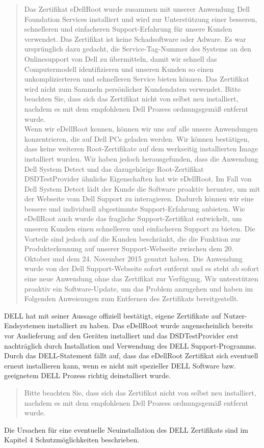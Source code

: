 \begin{quote}
	\glqq[...] Das Zertifikat eDellRoot wurde zusammen mit unserer Anwendung Dell Foundation Services installiert und wird zur Unterstützung einer besseren, schnelleren und einfacheren Support-Erfahrung für unsere Kunden verwendet. Das Zertifikat ist keine Schadsoftware oder Adware. Es war ursprünglich dazu gedacht, die Service-Tag-Nummer des Systems an den Onlinesupport von Dell zu übermitteln, damit wir schnell das Computermodell identifizieren und unseren Kunden so einen unkomplizierteren und schnelleren Service bieten können. Das Zertifikat wird nicht zum Sammeln persönlicher Kundendaten verwendet. Bitte beachten Sie, dass sich das Zertifikat nicht von selbst neu installiert, nachdem es mit dem empfohlenen Dell Prozess ordnungsgemäß entfernt wurde.\\
	Wenn wir eDellRoot kennen, können wir uns auf alle unsere Anwendungen konzentrieren, die auf Dell PCs geladen werden. Wir können bestätigen, dass keine weiteren Root-Zertifikate auf dem werkseitig installierten Image installiert wurden. Wir haben jedoch herausgefunden, dass die Anwendung Dell System Detect  und das dazugehörige Root-Zertifikat DSDTestProvider ähnliche Eigenschaften hat wie eDellRoot. Im Fall von Dell System Detect lädt der Kunde die Software proaktiv herunter, um mit der Webseite vom Dell Support zu interagieren. Dadurch können wir eine bessere und individuell abgestimmte Support-Erfahrung anbieten. Wie eDellRoot auch wurde das fragliche Support-Zertifikat entwickelt, um unseren Kunden einen schnelleren und einfacheren Support zu bieten. Die Vorteile sind jedoch auf die Kunden beschränkt, die die Funktion zur Produkterkennung auf unserer Support-Webseite zwischen dem 20. Oktober und dem 24. November 2015 genutzt haben. Die Anwendung wurde von der Dell Support-Webseite sofort entfernt und es steht ab sofort eine neue Anwendung ohne das Zertifikat zur Verfügung. Wir unterstützen proaktiv ein Software-Update, um das Problem anzugehen und haben im Folgenden Anweisungen zum Entfernen des Zertifikats bereitgestellt.\grqq \cite{dell}
\end{quote}
DELL hat mit seiner Aussage offiziell bestätigt, eigene Zertifikate auf Nutzer-Endsystemen installiert zu haben. Das eDellRoot wurde augenscheinlich bereits vor Auslieferung auf den Geräten installiert und das DSDTestProvider erst nachträglich durch Installation und Verwendung des DELL Support-Programms. Durch das DELL-Statement fällt auf, dass das eDellRoot Zertifikat sich eventuell erneut installieren kann, wenn es nicht mit spezieller DELL Software bzw. geeignetem DELL Prozess richtig deinstalliert wurde. 
\begin{quote}
	\glqq[...] Bitte beachten Sie, dass sich das Zertifikat nicht von selbst neu installiert, nachdem es mit dem empfohlenen Dell Prozess ordnungsgemäß entfernt wurde.\grqq \cite{dell}
\end{quote}
Die Ursachen für eine eventuelle Neuinstallation des DELL Zertifikats sind im Kapitel 4 Schutzmöglichkeiten beschrieben.